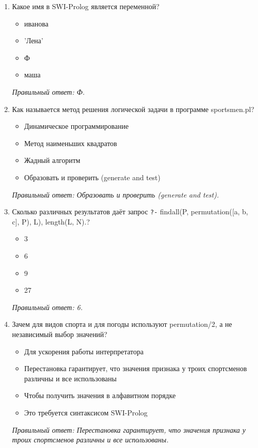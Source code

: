 \begin{enumerate}[label=\textbf{\arabic*.}, leftmargin=0pt, itemsep=1.2em]
\item Какое имя в SWI-Prolog является переменной?
\begin{itemize}[label=$\square$, leftmargin=1.5cm, itemsep=0.2em, topsep=0.3em]
\item иванова
\item 'Лена'
\item Ф
\item маша
\end{itemize}
{\small\textit{Правильный ответ: Ф.}}

\item Как называется метод решения логической задачи в программе sportsmen.pl?
\begin{itemize}[label=$\square$, leftmargin=1.5cm, itemsep=0.2em, topsep=0.3em]
\item Динамическое программирование
\item Метод наименьших квадратов
\item Жадный алгоритм
\item Образовать и проверить (generate and test)
\end{itemize}
{\small\textit{Правильный ответ: Образовать и проверить (generate and test).}}

\item Сколько различных результатов даёт запрос \texttt{?-} findall(P, permutation([a, b, c], P), L), length(L, N).?
\begin{itemize}[label=$\square$, leftmargin=1.5cm, itemsep=0.2em, topsep=0.3em]
\item 3
\item 6
\item 9
\item 27
\end{itemize}
{\small\textit{Правильный ответ: 6.}}

\item Зачем для видов спорта и для погоды используют permutation/2, а не независимый выбор значений?
\begin{itemize}[label=$\square$, leftmargin=1.5cm, itemsep=0.2em, topsep=0.3em]
\item Для ускорения работы интерпретатора
\item Перестановка гарантирует, что значения признака у троих спортсменов различны и все использованы
\item Чтобы получить значения в алфавитном порядке
\item Это требуется синтаксисом SWI-Prolog
\end{itemize}
{\small\textit{Правильный ответ: Перестановка гарантирует, что значения признака у троих спортсменов различны и все использованы.}}


\end{enumerate}
